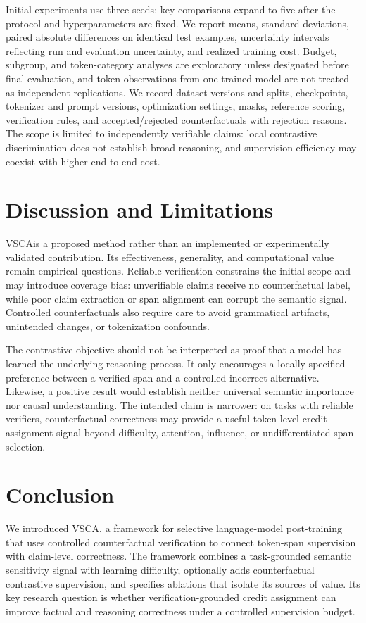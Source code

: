 \documentclass{article}
\newcommand{\vsca}{\textsc{VSCA}}
\begin{document}
Initial experiments use three seeds; key comparisons expand to five after the protocol and hyperparameters are fixed. We report means, standard deviations, paired absolute differences on identical test examples, uncertainty intervals reflecting run and evaluation uncertainty, and realized training cost. Budget, subgroup, and token-category analyses are exploratory unless designated before final evaluation, and token observations from one trained model are not treated as independent replications. We record dataset versions and splits, checkpoints, tokenizer and prompt versions, optimization settings, masks, reference scoring, verification rules, and accepted/rejected counterfactuals with rejection reasons. The scope is limited to independently verifiable claims: local contrastive discrimination does not establish broad reasoning, and supervision efficiency may coexist with higher end-to-end cost.

\section{Discussion and Limitations}
\label{sec:discussion}
\vsca is a proposed method rather than an implemented or experimentally validated contribution. Its effectiveness, generality, and computational value remain empirical questions. Reliable verification constrains the initial scope and may introduce coverage bias: unverifiable claims receive no counterfactual label, while poor claim extraction or span alignment can corrupt the semantic signal. Controlled counterfactuals also require care to avoid grammatical artifacts, unintended changes, or tokenization confounds.

The contrastive objective should not be interpreted as proof that a model has learned the underlying reasoning process. It only encourages a locally specified preference between a verified span and a controlled incorrect alternative. Likewise, a positive result would establish neither universal semantic importance nor causal understanding. The intended claim is narrower: on tasks with reliable verifiers, counterfactual correctness may provide a useful token-level credit-assignment signal beyond difficulty, attention, influence, or undifferentiated span selection.

\section{Conclusion}
We introduced \vsca, a framework for selective language-model post-training that uses controlled counterfactual verification to connect token-span supervision with claim-level correctness. The framework combines a task-grounded semantic sensitivity signal with learning difficulty, optionally adds counterfactual contrastive supervision, and specifies ablations that isolate its sources of value. Its key research question is whether verification-grounded credit assignment can improve factual and reasoning correctness under a controlled supervision budget.



\end{document}
